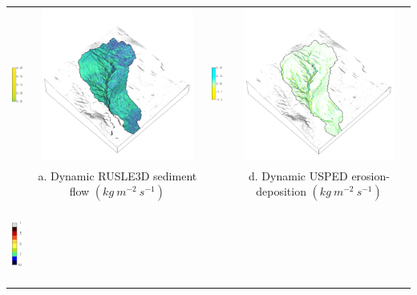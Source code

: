 \documentclass{standalone}
\begin{document}
\scriptsize
\centering 

\begin{tabular}{m{} m{} m{} m{}}
%
\multicolumn{1}{c}{\includegraphics[height=25mm]{../../images/rusle_3d/legend_flux.png}}
& \multicolumn{1}{c}{\includegraphics[height=50mm]{../../images/rusle_3d/flux.png}}
& \multicolumn{1}{c}{\includegraphics[height=25mm]{../../images/usped_3d/legend_erosion_deposition.png}}
& \multicolumn{1}{c}{\includegraphics[height=50mm]{../../images/usped_3d/erosion_deposition.png}}\\
\multicolumn{1}{c}{} 
& \multicolumn{1}{c}{a. Dynamic RUSLE3D sediment flow $(kg ~ m^{-2} ~ s^{-1})$}
& \multicolumn{1}{c}{} 
& \multicolumn{1}{c}{d. Dynamic USPED erosion-deposition $(kg ~ m^{-2} ~ s^{-1})$}\\
%
\multicolumn{1}{c}{\includegraphics[height=25mm]{../../images/rusle_3d/legend_landforms.png}}

\end{tabular}
\end{document}
